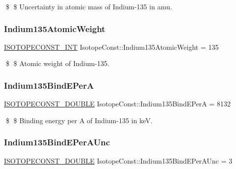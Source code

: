 \$ \$ Uncertainty in atomic mass of Indium-\/135 in amu. \mbox{\label{group___isotope_const-_indium-_in135_gad0a1b16bbd5671aafa606cd1df9e2c75}} 
\subsubsection{\texorpdfstring{Indium135\+Atomic\+Weight}{Indium135AtomicWeight}}
{\footnotesize\ttfamily \mbox{\hyperlink{group___isotope_const-_macros_ga5f18360b3e99483a35c32d789e62621c}{I\+S\+O\+T\+O\+P\+E\+C\+O\+N\+S\+T\+\_\+\+I\+NT}} Isotope\+Const\+::\+Indium135\+Atomic\+Weight = 135}

\$ \$ Atomic weight of Indium-\/135. \mbox{\label{group___isotope_const-_indium-_in135_gaefefad6f472da8c650bd437bcc41384f}} 
\subsubsection{\texorpdfstring{Indium135\+Bind\+E\+PerA}{Indium135BindEPerA}}
{\footnotesize\ttfamily \mbox{\hyperlink{group___isotope_const-_macros_ga8f45a7272ce02c0b4c65c44636ed719a}{I\+S\+O\+T\+O\+P\+E\+C\+O\+N\+S\+T\+\_\+\+D\+O\+U\+B\+LE}} Isotope\+Const\+::\+Indium135\+Bind\+E\+PerA = 8132}

\$ \$ Binding energy per A of Indium-\/135 in keV. \mbox{\label{group___isotope_const-_indium-_in135_ga904332d63dd4d7f7641023a04f192d9f}} 
\subsubsection{\texorpdfstring{Indium135\+Bind\+E\+Per\+A\+Unc}{Indium135BindEPerAUnc}}
{\footnotesize\ttfamily \mbox{\hyperlink{group___isotope_const-_macros_ga8f45a7272ce02c0b4c65c44636ed719a}{I\+S\+O\+T\+O\+P\+E\+C\+O\+N\+S\+T\+\_\+\+D\+O\+U\+B\+LE}} Isotope\+Const\+::\+Indium135\+Bind\+E\+Per\+A\+Unc = 3}

